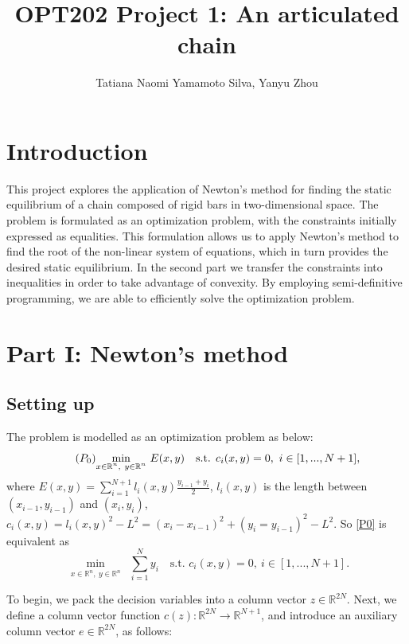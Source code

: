 \documentclass[10pt,a4paper,notitlepage,twocolumn]{article}
\title{OPT202 Project 1: An articulated chain}
\author{Tatiana Naomi Yamamoto Silva, Yanyu Zhou}
\begin{document}
\maketitle
\section{Introduction}
This project explores the application of Newton's method for finding the static equilibrium of a chain composed of rigid bars in two-dimensional space. The problem is formulated as an optimization problem, with the constraints initially expressed as equalities. This formulation allows us to apply Newton's method to find the root of the non-linear system of equations, which in turn provides the desired static equilibrium. In the second part we transfer the constraints into inequalities in order to take advantage of convexity. By employing semi-definitive programming, we are able to efficiently solve the optimization problem.

\section{Part I: Newton's method}
\subsection{Setting up}
The problem is modelled as an optimization problem as below:
\begin{equation}\label{P0}
\tag{$P_{0}$}
\underset{\substack{x \in \mathbb{R}^n,\ y \in \mathbb{R}^n}}{\min} \ E(x,y) \quad \text{s.t. } c_i(x,y) = 0,\ i \in [1,...,N+1],
\end{equation}
where
$E(x,y) = \sum\limits_{i=1}^{N+1} l_i(x,y)\frac{y_{i-1}+y_i}{2}$, $l_i(x,y)$ is the length between $(x_{i-1},y_{i-1})$ and $(x_i,y_i)$, $c_i(x,y) = l_i(x,y)^2 - L^2 = (x_i - x_{i-1})^2 + (y_i = y_{i-1})^2 - L^2$. So \eqref{P0} is equivalent as
\begin{equation}\label{P}
\tag{$P$}
\underset{\substack{x \in \mathbb{R}^n,\ y \in \mathbb{R}^n}}{\min} \ \sum\limits_{i=1}^N y_i \quad \text{s.t. } c_i(x,y) = 0,\ i \in [1,...,N+1].
\end{equation}


To begin, we pack the decision variables into a column vector $z \in \mathbb{R}^{2N}$. Next, we define a column vector function $c(z): \mathbb{R}^{2N} \rightarrow \mathbb{R}^{N+1}$, and introduce an auxiliary column vector $e \in \mathbb{R}^{2N}$, as follows:
\end{document}
